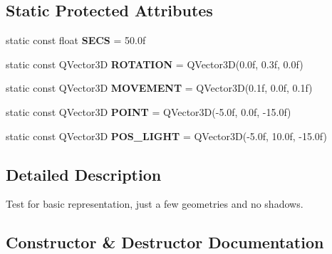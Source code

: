 \subsection*{Static Protected Attributes}
\begin{DoxyCompactItemize}
\item 
\mbox{\label{class_unit_test_1_1_c_basic_scene_test_a2b22f2923a353120b4ca5aa02a4c11b8}} 
static const float {\bfseries S\+E\+CS} = 50.\+0f
\item 
\mbox{\label{class_unit_test_1_1_c_basic_scene_test_a12ae681f7293ecfd5f7ccc670349dc79}} 
static const Q\+Vector3D {\bfseries R\+O\+T\+A\+T\+I\+ON} = Q\+Vector3D(0.\+0f, 0.\+3f, 0.\+0f)
\item 
\mbox{\label{class_unit_test_1_1_c_basic_scene_test_ae53cc2abb708148ee93194ada7b0db96}} 
static const Q\+Vector3D {\bfseries M\+O\+V\+E\+M\+E\+NT} = Q\+Vector3D(0.\+1f, 0.\+0f, 0.\+1f)
\item 
\mbox{\label{class_unit_test_1_1_c_basic_scene_test_a58708d7aaa9ff202427ba0a2fc39b100}} 
static const Q\+Vector3D {\bfseries P\+O\+I\+NT} = Q\+Vector3D(-\/5.\+0f, 0.\+0f, -\/15.\+0f)
\item 
\mbox{\label{class_unit_test_1_1_c_basic_scene_test_ac76a84f1d8512f4ba952c8428192b900}} 
static const Q\+Vector3D {\bfseries P\+O\+S\+\_\+\+L\+I\+G\+HT} = Q\+Vector3D(-\/5.\+0f, 10.\+0f, -\/15.\+0f)
\end{DoxyCompactItemize}


\subsection{Detailed Description}
Test for basic representation, just a few geometries and no shadows. 

\subsection{Constructor \& Destructor Documentation}
\mbox{\label{class_unit_test_1_1_c_basic_scene_test_a95b3e53cda711c09c0abc6a286e55af2}} 
